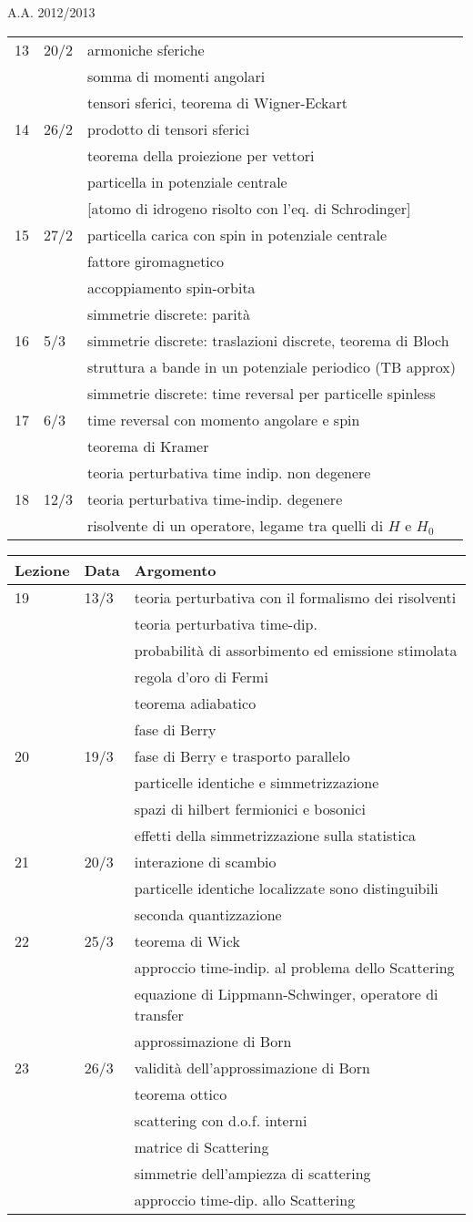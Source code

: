 \documentclass[a4paper, 12pt]{article}
\newcommand{\nl}{\\ & & }
\newcommand{\nr}{\\ \midrule}
\begin{document}
\begin{section}{A.A. 2012/2013}
\begin{tabular}{lll}
13 & 20/2 & armoniche sferiche \nl somma di momenti angolari \nl tensori sferici, teorema di Wigner-Eckart \nr

14 & 26/2 & prodotto di tensori sferici \nl teorema della proiezione per vettori \nl particella in  potenziale centrale \nl [atomo di idrogeno risolto con l'eq. di Schrodinger]\nr

15 & 27/2 & particella carica con spin in potenziale centrale \nl fattore giromagnetico \nl accoppiamento spin-orbita \nl simmetrie discrete: parità \nr 

16 & 5/3 & simmetrie discrete: traslazioni discrete, teorema di Bloch \nl struttura a bande in un potenziale periodico (TB approx) \nl simmetrie discrete: time reversal per particelle spinless  \nr 

17 & 6/3 & time reversal con momento angolare e spin \nl teorema di Kramer \nl teoria perturbativa time indip. non degenere\nr 

18 & 12/3 & teoria perturbativa time-indip. degenere \nl risolvente di un operatore, legame tra quelli di $H$ e $H_0$\nr

\end{tabular}

\begin{tabular}{lll}
Lezione & Data & Argomento\nr

19 & 13/3 & teoria perturbativa con il formalismo dei risolventi \nl teoria perturbativa time-dip. \nl probabilità di assorbimento ed emissione stimolata \nl regola d'oro di Fermi \nl teorema adiabatico \nl fase di Berry \nr 

20 & 19/3 & fase di Berry e trasporto parallelo \nl particelle identiche e simmetrizzazione \nl spazi di hilbert fermionici e bosonici \nl effetti della simmetrizzazione sulla statistica \nr 

21 & 20/3 & interazione di scambio \nl particelle identiche localizzate sono distinguibili \nl seconda quantizzazione \nr 

22 & 25/3 & teorema di Wick \nl approccio time-indip. al problema dello Scattering \nl equazione di Lippmann-Schwinger, operatore di transfer \nl approssimazione di Born \nr

23 & 26/3 & validità dell'approssimazione di Born \nl teorema ottico \nl scattering con d.o.f. interni \nl matrice di Scattering \nl simmetrie dell'ampiezza di scattering \nl approccio time-dip. allo Scattering  \nr
\bottomrule
\end{tabular}

\end{section}
\end{document}
